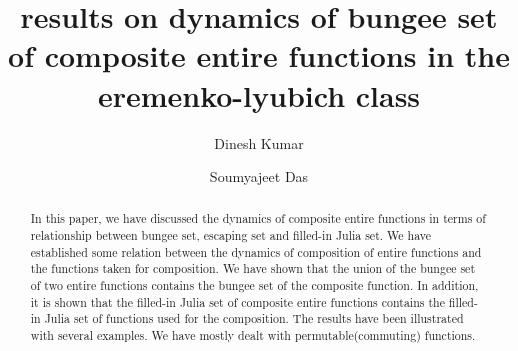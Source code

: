 \documentclass[a4paper,12pt]{amsart}
\numberwithin{equation}{section}
\begin{document}
\title[dynamics of bungee set of composite entire function]{results on dynamics of bungee set of composite entire functions in the eremenko-lyubich class}

\author[D. Kumar]{Dinesh Kumar}
\address{Department of Mathematics, Birla Institute of Technology Mesra, Ranchi, 
Jharkhand--835 215, India}

\author[S. Das]{Soumyajeet Das}
\address{Department of Physics, Birla Institute of Technology Mesra, Ranchi, 
Jharkhand--835 215, India}




 

\begin{abstract}
In this paper, we have discussed the dynamics of composite entire functions in terms of relationship between bungee set, escaping set and filled-in Julia set. We have established some relation between the dynamics of  composition of entire functions and the functions taken for composition. We have shown that the union of the bungee set of two entire functions contains the bungee set of the composite function. In addition, it is shown that the filled-in Julia  set of composite entire functions contains the filled-in Julia set of functions used for the composition. The results have been illustrated with several examples. We have mostly dealt with  permutable(commuting) functions.
\end{abstract}




\maketitle
\end{document}
